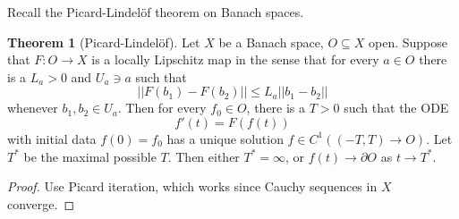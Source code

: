 \documentclass[12pt]{book}
\theoremstyle{definition}
\newtheorem{theorem}{Theorem}[chapter]
\begin{document}
Recall the Picard-Lindel\"of theorem on Banach spaces.
\begin{theorem}[Picard-Lindel\"of]
Let $X$ be a Banach space, $O \subseteq X$ open.
Suppose that $F: O \to X$ is a locally Lipschitz map in the sense that for every $a \in O$ there is a $L_a > 0$ and $U_a \ni a$ such that
$$||F(b_1) - F(b_2)|| \leq L_a ||b_1 - b_2||$$
whenever $b_1, b_2 \in U_a$. Then for every $f_0 \in O$, there is a $T > 0$ such that the ODE
$$f'(t) = F(f(t))$$
with initial data $f(0) = f_0$ has a unique solution $f \in C^1((-T, T) \to O)$.
Let $T^*$ be the maximal possible $T$. Then either $T^* = \infty$, or $f(t) \to \partial O$ as $t \to T^*$.
\end{theorem}
\begin{proof}
Use Picard iteration, which works since Cauchy sequences in $X$ converge.
\end{proof}
\end{document}
